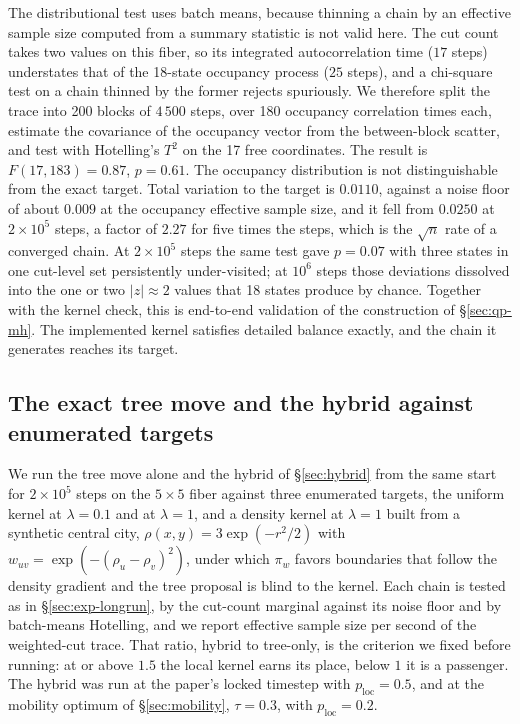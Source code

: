 \documentclass[11pt]{article}
\begin{document}
The distributional test uses batch means, because thinning a chain by
an effective sample size computed from a summary statistic is not
valid here. The cut count takes two values on this fiber, so its
integrated autocorrelation time ($17$ steps) understates that of the
18-state occupancy process ($25$ steps), and a chi-square test on a
chain thinned by the former rejects spuriously. We therefore split
the trace into 200 blocks of $4\,500$ steps, over 180 occupancy
correlation times each, estimate the covariance of the occupancy
vector from the between-block scatter, and test with Hotelling's
$T^2$ on the 17 free coordinates. The result is $F(17, 183) = 0.87$,
$p = 0.61$. The occupancy distribution is not distinguishable from
the exact target. Total variation to the target is $0.0110$, against
a noise floor of about $0.009$ at the occupancy effective sample
size, and it fell from $0.0250$ at $2 \times 10^5$ steps, a factor of
$2.27$ for five times the steps, which is the $\sqrt{n}$ rate of a
converged chain. At $2 \times 10^5$ steps the same test gave
$p = 0.07$ with three states in one cut-level set persistently
under-visited; at $10^6$ steps those deviations dissolved into the
one or two $|z| \approx 2$ values that 18 states produce by chance.
Together with the kernel check, this is end-to-end validation of the
construction of \S\ref{sec:qp-mh}. The implemented kernel satisfies
detailed balance exactly, and the chain it generates reaches its
target.

\subsection{The exact tree move and the hybrid against enumerated targets}\label{sec:exp-hybrid}

We run the tree move alone and the hybrid of \S\ref{sec:hybrid} from
the same start for $2 \times 10^5$ steps on the $5 \times 5$ fiber
against three enumerated targets, the uniform kernel at
$\lambda = 0.1$ and at $\lambda = 1$, and a density kernel at
$\lambda = 1$ built from a synthetic central city,
$\rho(x,y) = 3\exp(-r^2/2)$ with $w_{uv} = \exp(-(\rho_u - \rho_v)^2)$,
under which $\pi_w$ favors boundaries that follow the density
gradient and the tree proposal is blind to the kernel. Each chain is
tested as in \S\ref{sec:exp-longrun}, by the cut-count marginal
against its noise floor and by batch-means Hotelling, and we report
effective sample size per second of the weighted-cut trace. That
ratio, hybrid to tree-only, is the criterion we fixed before running:
at or above $1.5$ the local kernel earns its place, below $1$ it is a
passenger. The hybrid was run at the paper's locked timestep with
$p_{\mathrm{loc}} = 0.5$, and at the mobility optimum of
\S\ref{sec:mobility}, $\tau = 0.3$, with $p_{\mathrm{loc}} = 0.2$.
\end{document}
